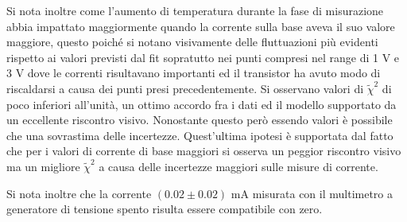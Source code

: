 \documentclass[a4paper,11pt]{article}
\begin{document}
Si nota inoltre come l'aumento di temperatura durante la fase di misurazione abbia impattato maggiormente quando la corrente sulla base aveva il suo valore maggiore, questo poiché si notano visivamente delle fluttuazioni più evidenti rispetto ai valori previsti dal fit sopratutto nei punti compresi nel range di 1 V e 3 V dove le correnti risultavano importanti ed il transistor ha avuto modo di riscaldarsi a causa dei punti presi precedentemente.
Si osservano  valori di $\tilde\chi^2$ di poco inferiori all'unità, un ottimo accordo fra i dati ed il modello supportato da un eccellente riscontro visivo. Nonostante questo però essendo valori è possibile che una sovrastima delle incertezze. Quest'ultima ipotesi è supportata dal fatto che per i valori di corrente di base maggiori si osserva un peggior riscontro visivo ma un migliore $\tilde\chi^2$ a causa delle incertezze maggiori sulle misure di corrente.


Si nota inoltre che la corrente $(0.02 \pm 0.02)$ $ \mathrm{mA}$ misurata con il multimetro a generatore di tensione spento risulta essere compatibile con zero.



\medskip

\printbibliography


\end{document}
